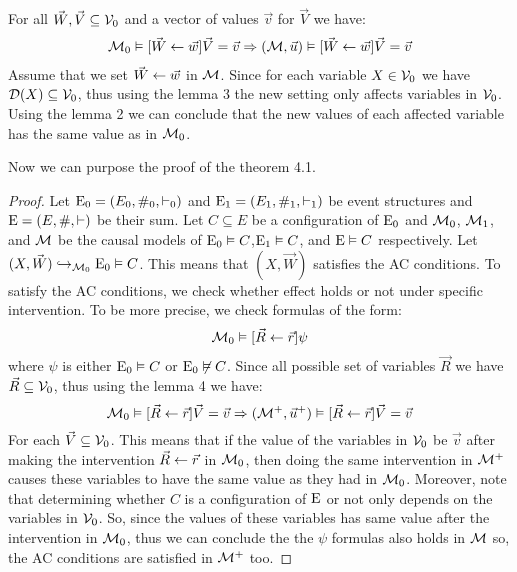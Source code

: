 \begin{lemma}
    For all $\vec W, \vec V \subseteq \mathcal{V}_0$ and a vector of values $\vec v$
    for $\vec V$ we have:
    \begin{align*}
        \mathcal{M}_0 \vDash [\vec W \leftarrow \vec w]\vec V = \vec v
        \Rightarrow (\mathcal{M},\vec u) \vDash [\vec W \leftarrow \vec w] \vec V = \vec v
    \end{align*}
    Assume that we set $\vec W \leftarrow \vec w$ in $\mathcal{M}$.
    Since for each variable $X \in \mathcal{V}_0$ we have
    $\mathcal{D}(X) \subseteq \mathcal{V}_0$, thus using the lemma 3 the new setting
    only affects variables in $\mathcal{V}_0$.
    Using the lemma 2 we can conclude that the new values of each affected
    variable has the same value as in $\mathcal{M}_0$.
\end{lemma}
\noindent Now we can purpose the proof of the theorem 4.1.
\begin{proof}
    Let $\mathrm{E}_0 = (E_0,\#_0,\vdash_0)$ and $\mathrm{E}_1 = (E_1,\#_1,\vdash_1)$ be event
    structures and $\mathrm{E} = (E,\#,\vdash)$ be their sum.
    Let $C \subseteq E$ be a configuration of $\mathrm{E}_0$
    and $\mathcal{M}_0$, $\mathcal{M}_1$, and $\mathcal{M}$ be the causal models
    of $\mathrm{E}_0 \vDash C$,$\mathrm{E}_1 \vDash C$, and $\mathrm{E} \vDash C$ respectively.
    Let $(X,\vec W) \hookrightarrow_{\mathcal{M}_0} \mathrm{E}_0 \vDash C$.
    This means that $(X,\vec W)$ satisfies the AC conditions.
    To satisfy the AC conditions, we check whether effect holds or not
    under specific intervention.
    To be more precise, we check formulas of the form:
    \begin{equation*}
        \mathcal{M}_0\vDash[\vec R \leftarrow \vec r] \psi
    \end{equation*}
    where $\psi$ is either $\mathrm{E}_0 \vDash C$ or $\mathrm{E}_0 \not \vDash C$.
    Since all possible set of variables $\vec R$ we have
    $\vec R \subseteq \mathcal{V}_0$, thus using the lemma 4 we have:
    \begin{equation*}
        \mathcal{M}_0\vDash[\vec R \leftarrow \vec r] \vec V = \vec v
        \Rightarrow
        (\mathcal{M}^+,\vec u^+)\vDash[\vec R \leftarrow \vec r] \vec V = \vec v
    \end{equation*}
    For each $\vec V \subseteq \mathcal{V}_0$.
    This means that if the value of the variables in $\mathcal{V}_0$ be $\vec v$
    after making the intervention $\vec R \leftarrow \vec r$ in $\mathcal{M}_0$,
    then doing the same intervention in $\mathcal{M}^+$ causes these variables to
    have the same value as they had in $\mathcal{M}_0$.
    Moreover, note that determining whether $C$ is a configuration of
    $\mathrm{E}$ or not only depends on the variables in $\mathcal{V}_0$.
    So, since the values of these variables has same value after
    the intervention in $\mathcal{M}_0$, thus we can conclude the
    the $\psi$ formulas also holds in $\mathcal{M}$ so, the AC conditions
    are satisfied in $\mathcal{M}^+$ too.
\end{proof}